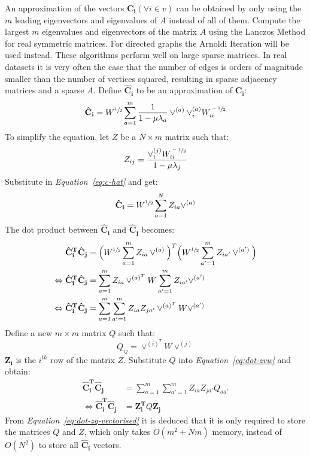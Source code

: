 \documentclass[12pt]{report}
\begin{document}
%
%
An approximation of the vectors $\mathbf{C_i} (\forall i \in v)$ can be obtained
by only using the $m$ leading eigenvectors and eigenvalues of $A$ instead of all of
them. Compute the largest $m$ eigenvalues and eigenvectors of the matrix $A$ using
the Lanczos Method for real symmetric matrices\cite{calvetti1994implicitly}. For directed graphs the Arnoldi
Iteration \cite{lehoucq1996deflation} will be used instead. These algorithms perform well on large sparse
matrices. In real datasets it is very often the case that the number of edges is
orders of magnitude smaller than the number of vertices squared, resulting in sparse
adjacency matrices and a sparse $A$. Define $\mathbf{\hat{C}_i}$ to be an approximation of $\mathbf{C_i}$:
%
\begin{equation}
\label{eq:c-hat}
\mathbf{\hat{C}_i} = W^{\sfrac{1}{2}} \sum_{a=1}^{m} \frac{1}{1 - \mu \lambda_a} \vee^{(a)} \vee^{(a)}_i W^{\sfrac{-1}{2}}_{ii}
\end{equation}
%
%
To simplify the equation, let $Z$ be a $N \times m$ matrix such that:
\begin{equation}
\label{eq:z-ij}
Z_{ij} = \frac{\vee^{(j)}_i W^{\sfrac{-1}{2}}_{ii}}{1-\mu \lambda_j}
\end{equation}
%
Substitute in \emph{Equation~\ref{eq:c-hat}} and get:
%
\begin{equation}
\label{eq:ci-rearranged-z}
\mathbf{\hat{C}_i} = W^{\sfrac{1}{2}} \sum_{a=1}^{N} Z_{ia} \vee^{(a)}
\end{equation}
%
The dot product between $\mathbf{\hat{C}_i}$ and $\mathbf{\hat{C}_j}$ becomes:
\begin{align}
%
\mathbf{\hat{C}_i^T} \mathbf{\hat{C}_j} &= \Big(  W^{\sfrac{1}{2}} \sum_{a=1}^{m} Z_{ia} \vee^{(a)} \Big)^T \Big(  W^{\sfrac{1}{2}} \sum_{a'=1}^{m} Z_{ia'} \vee^{(a')} \Big)
\\
\Leftrightarrow \mathbf{\hat{C}_i^T} \mathbf{\hat{C}_j} &= \sum_{a=1}^{m} Z_{ia}  \vee^{(a)^T} W \sum_{a'=1}^{m} Z_{ia'} \vee^{(a')}
\\
\Leftrightarrow \mathbf{\hat{C}_i^T} \mathbf{\hat{C}_j} &= \sum_{a=1}^m \sum_{a'=1}^m Z_{ia} Z_{ja'} \vee^{(a)^T} W \vee^{(a')} \label{eq:dot-zvw}
\end{align}
%
%
Define a new $m \times m$ matrix $Q$ such that:
%
\begin{equation}
\label{eq:q-ij}
Q_{ij} = \vee^{(i)^T} W \vee^{(j)}
\end{equation}
$\mathbf{Z_i}$ is the $i^{th}$ row of the matrix $Z$. Substitute $Q$ into \emph{Equation~\ref{eq:dot-zvw}} and obtain:
\begin{align}
\mathbf{\hat{C}_i^T} \mathbf{\hat{C}_j} &= \sum_{a=1}^m \sum_{a'=1}^m Z_{ia} Z_{ja'} Q_{aa'} \label{eq:dot-zq-sum} \\
\Leftrightarrow \mathbf{\hat{C}_i^T} \mathbf{\hat{C}_j} &= \mathbf{Z_i^T} Q \mathbf{Z_j} \label{eq:dot-zq-vectorised}
\end{align}
%
%
From \emph{Equation~\ref{eq:dot-zq-vectorised}} it is deduced that it is only
required to store the matrices $Q$ and $Z$, which only takes $O(m^2 + Nm)$ memory,
instead of $O(N^2)$ to store all $\mathbf{\hat{C}_i}$ vectors.
\end{document}
